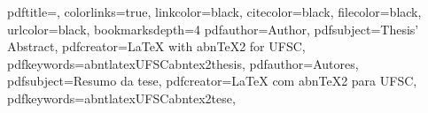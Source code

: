 \makeatletter
{}
{




    {
        \hypersetup
        {
            pdftitle={\@title},
            colorlinks=true, %
            linkcolor=black, %
            citecolor=black, %
            filecolor=black, %
            urlcolor=black,
            bookmarksdepth=4
        }
        \ifenglish
            \hypersetup
            {
                pdfauthor={Author},
                pdfsubject={Thesis' Abstract},
                pdfcreator={LaTeX with abnTeX2 for UFSC},
                pdfkeywords={abnt}{latex}{UFSC}{abntex2}{thesis},
            }
        \else
            \hypersetup
            {
                pdfauthor={Autores},
                pdfsubject={Resumo da tese},
                pdfcreator={LaTeX com abnTeX2 para UFSC},
                pdfkeywords={abnt}{latex}{UFSC}{abntex2}{tese},
            }
        \fi
    }
}{}
\makeatother


\renewcommand{\cftpartfont}{\ABNTEXpartfont\color{ultramarine}}
\renewcommand{\cftpartpagefont}{\ABNTEXpartfont\color{black}}

